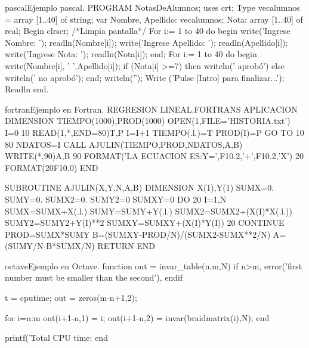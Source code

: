 \begin{sourcecode}{pascal}{Ejemplo pascal.}
PROGRAM NotasDeAlumnos;
uses crt;
Type
vecalumnos = array [1..40] of string;
var
Nombre, Apellido: vecalumnos;
Nota: array [1..40] of real;
Begin
clrscr; /*Limpia pantalla*/
For i:= 1 to 40 do
	begin
		write('Ingrese Nombre: ');
		readln(Nombre[i]);
		write('Ingrese Apellido: ');
		readln(Apellido[i]);
		write('Ingrese Nota: ');
		readln(Nota[i]);
	end;
For i:= 1 to 40 do
	begin
		write(Nombre[i], ' ',Apellido[i]);
		if (Nota[i] >=7) then
			writeln(' aprobó')
		else
			writeln(' no aprobó');
	end;
writeln('');
Write ('Pulse [Intro] para finalizar...');
Readln
end.
\end{sourcecode}

\begin{sourcecode}{fortran}{Ejemplo en Fortran.}
REGRESION LINEAL.FORTRANS
APLICACION
     DIMENSION TIEMPO(1000),PROD(1000)
        OPEN(1,FILE='HISTORIA.txt')
        I=0
 10     READ(1,*,END=80)T,P
        I=I+1
        TIEMPO(.l.)=T
        PROD(I)=P
        GO TO 10
 80     NDATOS=I
        CALL AJULIN(TIEMPO,PROD,NDATOS,A,B)
        WRITE(*,90)A,B
 90     FORMAT('LA ECUACION ES:Y=',F10.2,'+',F10.2,'X')
 20     FORMAT(20F10.0)
        END


        SUBROUTINE AJULIN(X,Y,N,A,B)
         DIMENSION X(1),Y(1)
          SUMX=0.
          SUMY=0.
          SUMX2=0.
          SUMY2=0
          SUMXY=0
        DO 20 I=1,N
         SUMX=SUMX+X(.l.)
         SUMY=SUMY+Y(.l.)
         SUMX2=SUMX2+(X(I)*X(.l.))
         SUMY2=SUMY2+Y(I)**2
         SUMXY=SUMXY+(X(I)*Y(I))
 20    CONTINUE
        PROD=SUMX*SUMY
        B=(SUMXY-PROD/N)/(SUMX2-SUMX**2/N)
        A=(SUMY/N-B*SUMX/N)
       RETURN
       END
\end{sourcecode}

\begin{sourcecode}{octave}{Ejemplo en Octave.}
function out = invar_table(n,m,N)
if n>m, error('first number must be smaller than the second'), endif

t = cputime;
out = zeros(m-n+1,2);

for i=n:m
  out(i+1-n,1) = i;
  out(i+1-n,2) = invar(braidmatrix(i),N);
end

printf('Total CPU time: %
end
\end{sourcecode}

